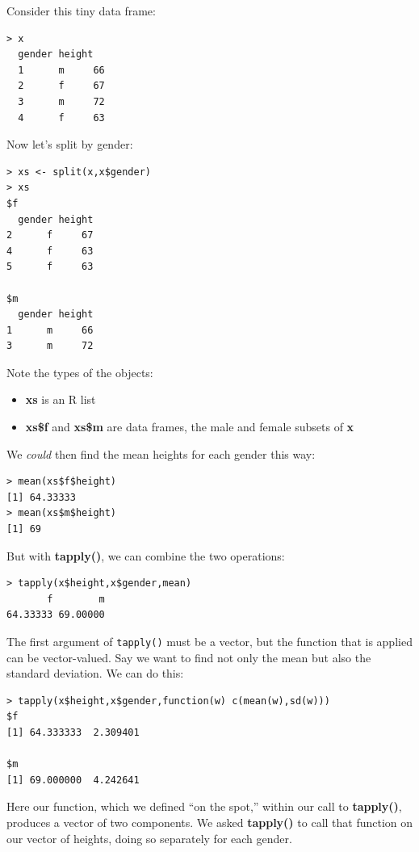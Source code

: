 Consider this tiny data frame:

\begin{lstlisting}
> x
  gender height
  1      m     66
  2      f     67
  3      m     72
  4      f     63
\end{lstlisting}

Now let's split by gender:

\begin{lstlisting}
> xs <- split(x,x$gender)
> xs
$f
  gender height
2      f     67
4      f     63
5      f     63

$m
  gender height
1      m     66
3      m     72
\end{lstlisting}

Note the types of the objects: 

\begin{itemize}

\item {\bf xs} is an R list

\item {\bf xs\$f} and {\bf xs\$m} are data frames, the male and female
subsets of {\bf x}

\end{itemize}

We {\it could} then find the mean heights for each gender this way:

\begin{lstlisting}
> mean(xs$f$height)
[1] 64.33333
> mean(xs$m$height)
[1] 69
\end{lstlisting}

But with {\bf tapply()}, we can combine the two operations:

\begin{lstlisting}
> tapply(x$height,x$gender,mean)
       f        m 
64.33333 69.00000 
\end{lstlisting}

The first argument of {\tt tapply()} must be a vector, but the function
that is applied can be vector-valued.  Say we want to find not only the
mean but also the standard deviation.  We can do this:

\begin{lstlisting}
> tapply(x$height,x$gender,function(w) c(mean(w),sd(w)))
$f
[1] 64.333333  2.309401

$m
[1] 69.000000  4.242641
\end{lstlisting}

Here our function, which we defined ``on the spot,'' within our call to
{\bf tapply()}, produces a vector of two components.  We asked {\bf
tapply()} to call that function on our vector of heights, doing so
separately for each gender.

